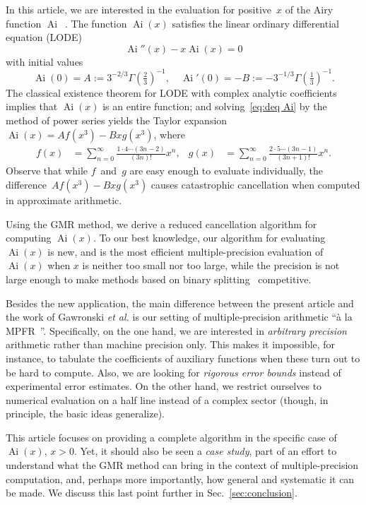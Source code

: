 \documentclass[10pt, conference]{IEEEtran}
\DeclareMathOperator{\Ai}{Ai}
\newcommand{\assign}{:=}
\begin{document}
In this article, we are interested in the evaluation for positive~$x$ of the
Airy function $\Ai$~\cite[Chap.~9]{DLMF}.
The function $\Ai(x)$ satisfies the linear ordinary
differential equation (LODE)
\begin{equation}
  \Ai''(x) - x \Ai(x) = 0
  \label{eq:deq Ai}
\end{equation}
with initial values
\[
  \Ai(0) = A \assign 3^{-2 / 3} \Gamma (\tfrac{2}{3})^{-1}, \hspace{1em}
    \Ai'(0) = - B \assign -3^{-1 / 3} \Gamma (\tfrac{1}{3})^{-1}.
\]
The classical existence theorem for LODE with complex analytic coefficients
implies that $\Ai(x)$ is an entire function; and
solving~\eqref{eq:deq Ai} by the method of power series yields the Taylor
expansion $\Ai(x) = A f(x^3) - Bxg(x^3)$, where
\begin{align*}
  f(x) &=
  \sum_{n=0}^{{\infty}}{\frac{1{\cdot}4{\cdots}(3n-2)}{(3n)!}} x^n, &
  g(x) &=
  \sum_{n=0}^{{\infty}}{\frac{2{\cdot}5{\cdots}(3n-1)}{(3n+1)!}} x^n.
\end{align*}
Observe that while $f$~and~$g$ are easy enough to evaluate individually, the
difference~$A f(x^3) - Bxg(x^3)$ causes catastrophic cancellation when computed in
approximate arithmetic.

Using the GMR method, we derive a reduced cancellation algorithm for
computing $\Ai(x)$.
To our best knowledge, our algorithm for evaluating $\Ai(x)$ is new, and is the
most efficient multiple-precision evaluation of $\Ai(x)$
when $x$ is neither too small nor too large, while the precision is not large
enough to make methods based on binary splitting~\cite{BrentZimmermann2010} competitive.

Besides the new application, the main difference between the
present article and the work of Gawronski {\emph{et al.}} is our setting of
multiple-precision arithmetic ``\`a la
MPFR~{\cite{FousseHanrotLefevrePelissierZimmermann2007}}''. Specifically, on
the one hand, we are interested in {\emph{arbitrary precision}} arithmetic
rather than machine precision only. This makes it impossible, for instance, to
tabulate the coefficients of auxiliary functions when these turn out to be
hard to compute. Also, we are looking for {\emph{rigorous error bounds}}
instead of experimental error estimates. On the other hand, we restrict
ourselves to numerical evaluation on a half line instead of a complex sector (though, in principle, the basic ideas generalize).

This article focuses on providing a complete algorithm in the specific
case of $\Ai(x)$, $x > 0$. Yet, it should also be seen a
{\emph{case study}}, part of an effort to understand what the GMR method can
bring in the context of multiple-precision computation, and, perhaps more
importantly, how general and systematic it can be made. We discuss this last
point further in Sec.~\ref{sec:conclusion}.
\end{document}
